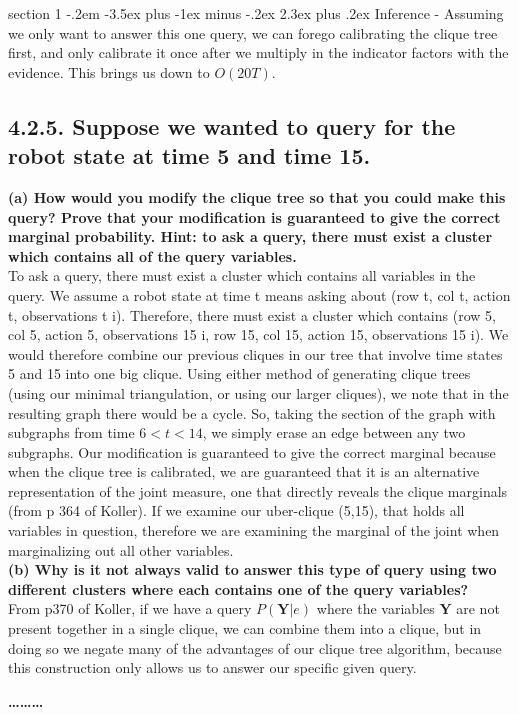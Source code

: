 \documentclass[12pt]{article}
\makeatletter
\newenvironment{problem}{\@startsection
       {section}
       {1}
       {-.2em}
       {-3.5ex plus -1ex minus -.2ex}
       {2.3ex plus .2ex}
       {\pagebreak[3]%
       \large\bf\noindent{Problem }
       }
       }
       {%
       \begin{center}\large\bf \ldots\ldots\ldots\end{center}}
\makeatother
\begin{document}
\begin{problem}{Inference}
\noindent - Assuming we only want to answer this one query, we can forego calibrating the clique tree first, and only calibrate it once after we multiply in the indicator factors with the evidence.  This brings us down to $O(20T)$.\\

\subsection*{4.2.5. Suppose we wanted to query for the robot state at time 5 and time 15.}
{\bf (a) How would you modify the clique tree so that you could make this query?
Prove that your modification is guaranteed to give the correct marginal probability.
Hint: to ask a query, there must exist a cluster which contains all of the query variables.}\\
To ask a query, there must exist a cluster which contains all variables in the query.  We assume a robot state at time t means asking about (row t, col t, action t, observations t i).  Therefore, there must exist a cluster which contains (row 5, col 5, action 5, observations 15 i, row 15, col 15, action 15, observations 15 i).  We would therefore combine our previous cliques in our tree that involve time states 5 and 15 into one big clique.  Using either method of generating clique trees (using our minimal triangulation, or using our larger cliques), we note that in the resulting graph there would be a cycle.  So, taking the section of the graph with subgraphs from time $6 < t < 14$, we simply erase an edge between any two subgraphs.  Our modification is guaranteed to give the correct marginal because when the clique tree is calibrated, we are guaranteed that it is an alternative representation of the joint measure, one that directly reveals the clique marginals (from p 364 of Koller).  If we examine our uber-clique (5,15), that holds all variables in question, therefore we are examining the marginal of the joint when marginalizing out all other variables.\\
{\bf (b) Why is it not always valid to answer this type of query using two different clusters where each contains one of the query variables?} \\
From p370 of Koller, if we have a query $P(\textbf{Y} | e)$ where the variables $\textbf{Y}$ are not present together in a single clique, we can combine them into a clique, but in doing so we negate many of the advantages of our clique tree algorithm, because this construction only allows us to answer our specific given query. \\

\end{problem}
\end{document}
